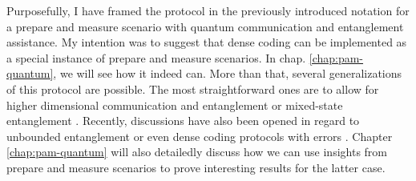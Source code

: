             Purposefully, I have framed the protocol in the previously introduced notation for a prepare and measure scenario with quantum communication and entanglement assistance. My intention was to suggest that dense coding can be implemented as a special instance of prepare and measure scenarios. In chap. \ref{chap:pam-quantum}, we will see how it indeed can. More than that, several generalizations of this protocol are possible. The most straightforward ones are to allow for higher dimensional communication and entanglement \cite{bennett_1992_superdense} or mixed-state entanglement \cite{barenco_dense_1995}. Recently, discussions have also been opened in regard to unbounded entanglement \cite{tavakoli_eapam_2021} or even dense coding protocols with errors \cite{nayak_rigidity_2020,moreno_pamdense_2021}. Chapter \ref{chap:pam-quantum} will also detailedly discuss how we can use insights from prepare and measure scenarios to prove interesting results for the latter case.